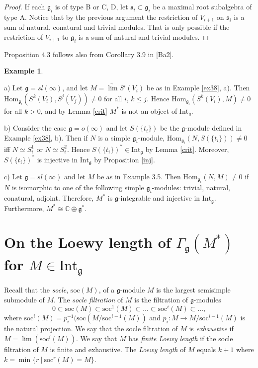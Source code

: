 \documentclass{birkmult}
\newcounter{theorem}
\newtheorem{example}[theo]{Example}
\newcommand {\CC} {\mathbb {C}}
\renewcommand{\gg}{\mathfrak{g}}
\newcommand{\refex}[1]{Example \ref{#1}}
\newcommand{\Int}{\mathrm{Int}}
\newcommand{\soc}{\mathrm{soc}}
\renewcommand{\hom}{\mathrm{Hom}}
\begin{document}
\begin{proof}
If each $\gg_i$ is of type B or C, D, let $\mathfrak s_i\subset
\gg_i$ be a maximal root subalgebra of type A. Notice that by the
previous argument the restriction of $V_{i+1}$ on $\mathfrak s_i$
is a sum of natural, conatural and trivial modules. That is only
possible if the restriction of $V_{i+1}$ to $\gg_i$ is a sum of
natural and trivial modules.
\end{proof}

Proposition 4.3 follows also from Corollary 3.9 in [Ba2].

\begin{example}\end{example}

a) Let $\gg=sl(\infty)$, and let
$M=\underrightarrow{\lim}S^i(V_i)$ be as in \refex{ex38}, a). Then
$\hom_{\gg_i}(S^k(V_i),S^j(V_j))\neq 0$ for all $i$, $k\leq j$.
Hence $\hom_{\gg_i}(S^k(V_i),M)\neq 0$ for all $k>0$, and by Lemma
\ref{crit} $M^*$ is not an object of $\Int_\gg$.

b) Consider the case $\gg=o(\infty)$ and let $S(\{t_i\})$ be the
$\gg$-module defined in \refex{ex38}, b). Then if $N$ is a simple
$\gg_i$-module, $\hom_{\gg_i}(N,S(\{t_i\}))\neq 0$ iff $N\simeq
S^1_i$ or $N\simeq S^2_i$. Hence $S(\{t_i\})^*\in \Int_\gg$ by
Lemma \ref{crit}. Moreover, $S(\{t_i\})^*$  is injective in $\Int_{\gg}$ by
Proposition \ref{inj}.

c) Let $\gg=sl(\infty)$ and let $M$ be as in Example 3.5. Then
$\hom_{\gg_i}(N,M)\neq 0$ if $N$ is isomorphic to one of the
following simple $\gg_i$-modules: trivial, natural, conatural, adjoint.
Therefore, $M^*$ is $\gg$-integrable and injective in $\Int_\gg$.
Furthermore, $M^*\cong\CC\oplus \gg^*$.

\section{On the Loewy length of $\Gamma_{\gg}(M^*)$ for $M\in\Int_{\gg}$}

Recall that the  {\it socle}, $\soc (M)$, of a $\gg$-module $M$ is
the largest semisimple submodule of $M$. The {\it socle
filtration} of $M$ is the filtration of $\gg$-modules
$$0\subset \soc  (M)\subset \soc^1 (M)\subset\dots\subset \soc^i (M)\subset\dots,$$
where $\soc^i (M)=p_i^{-1}(\soc (M/\soc^{i-1}(M))$ and $p_i:M\to
M/\soc^{i-1} (M)$ is the natural projection. We say that the socle
filtration of $M$ is {\it exhaustive} if $M=\underrightarrow{\lim}
(\soc^i(M))$. We say that $M$ has {\it finite Loewy length} if the
socle filtration of $M$ is finite and exhaustive. The {\it Loewy
length} of $M$ equals $k+1$ where $k=\min\{r\ |\ \soc^r(M)=M\}$.
\end{document}
